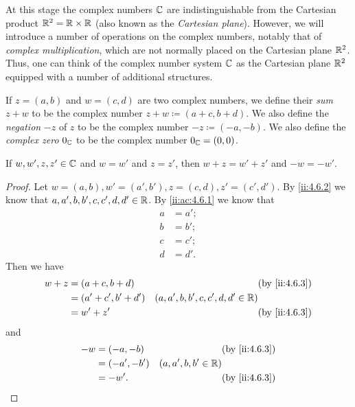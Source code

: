 \begin{note}
  At this stage the complex numbers \(\mathbb{C}\) are indistinguishable from the Cartesian product \(\mathbb{R}^2 = \mathbb{R} \times \mathbb{R}\)
  (also known as the \emph{Cartesian plane}).
  However, we will introduce a number of operations on the complex numbers, notably that of \emph{complex multiplication}, which are not normally placed on the Cartesian plane \(\mathbb{R}^2\).
  Thus, one can think of the complex number system \(\mathbb{C}\) as the Cartesian plane \(\mathbb{R}^2\) equipped with a number of additional structures.
\end{note}

\begin{defn}\label{ii:4.6.3}
  If \(z = (a, b)\) and \(w = (c, d)\) are two complex numbers, we define their \emph{sum} \(z + w\) to be the complex number \(z + w \coloneqq (a + c, b + d)\).
  We also define the \emph{negation} \(-z\) of \(z\) to be the complex number \(-z \coloneqq (-a, -b)\).
  We also define the \emph{complex zero} \(0_{\mathbb{C}}\) to be the complex number \(0_{\mathbb{C}} = (0, 0)\).
\end{defn}

\begin{ac}\label{ii:ac:4.6.2}
  If \(w, w', z, z' \in \mathbb{C}\) and \(w = w'\) and \(z = z'\), then \(w + z = w' + z'\) and \(-w = -w'\).
\end{ac}

\begin{proof}
  Let \(w = (a, b), w' = (a', b'), z = (c, d), z' = (c', d')\).
  By \cref{ii:4.6.2} we know that \(a, a', b, b', c, c', d, d' \in \mathbb{R}\).
  By \cref{ii:ac:4.6.1} we know that
  \begin{align*}
    a & = a'; \\
    b & = b'; \\
    c & = c'; \\
    d & = d'.
  \end{align*}
  Then we have
  \begin{align*}
    w + z & = (a + c, b + d)     &                                     & \by{ii:4.6.3} \\
          & = (a' + c', b' + d') & (a, a', b, b', c, c', d, d' \in \R)                 \\
          & = w' + z'            &                                     & \by{ii:4.6.3}
  \end{align*}
  and
  \begin{align*}
    -w & = (-a, -b)   &                       & \by{ii:4.6.3} \\
       & = (-a', -b') & (a, a', b, b' \in \R)                 \\
       & = -w'.       &                       & \by{ii:4.6.3}
  \end{align*}
\end{proof}

